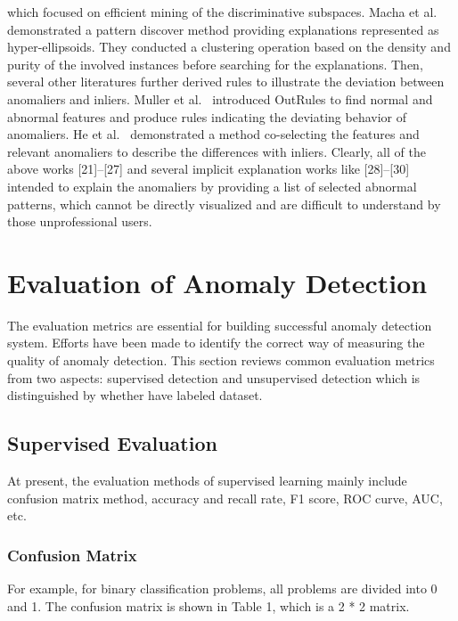 which focused on efficient mining of the discriminative subspaces. 
Macha et al.~\cite{macha2018explaining} 
demonstrated a pattern discover method providing explanations represented as hyper-ellipsoids. 
They conducted a clustering operation based on the density and 
purity of the involved instances before searching for the explanations. 
Then, 
several other literatures further derived rules to 
illustrate the deviation between anomaliers and 
inliers. 
Muller et al.~\cite{muller2012outrules} 
introduced OutRules to 
find normal and abnormal features and 
produce rules indicating the deviating behavior of anomaliers. 
He et al.~\cite{he2010co} 
demonstrated a method co-selecting the features and 
relevant anomaliers to 
describe the differences with inliers. 
Clearly, 
all of the above works [21]–[27] and 
several implicit explanation works like [28]–[30] intended to 
explain the anomaliers by providing a list of selected abnormal patterns, 
which cannot be directly visualized and 
are difficult to understand 
by those unprofessional users.


\section{Evaluation of Anomaly Detection}

The evaluation metrics are essential for 
building successful anomaly detection system. 
Efforts have been made to identify the correct way of
measuring the quality of anomaly detection. 
This section
reviews common evaluation metrics from two aspects: 
supervised detection 
and unsupervised detection which is 
distinguished by whether have labeled dataset.

\subsection{Supervised Evaluation}
At present, 
the evaluation methods of supervised learning mainly
include confusion matrix method, accuracy and recall rate,
F1 score,
ROC curve,
AUC,
etc.

\subsubsection{Confusion Matrix}
For example,
for binary classification problems,
all problems are divided into 0 and 1.
The confusion matrix is shown in Table 1,
which is a 2 * 2 matrix.


